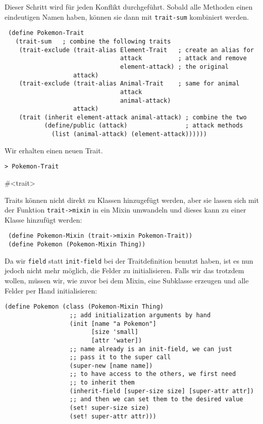 Dieser Schritt wird für jeden Konflikt durchgeführt. Sobald alle Methoden einen eindeutigen Namen haben, können sie dann mit \texttt{trait-sum} kombiniert werden.

\begin{lstlisting}
 (define Pokemon-Trait
   (trait-sum   ; combine the following traits
    (trait-exclude (trait-alias Element-Trait   ; create an alias for
                                attack          ; attack and remove
                                element-attack) ; the original
                   attack)
    (trait-exclude (trait-alias Animal-Trait    ; same for animal
                                attack         
                                animal-attack)
                   attack)
    (trait (inherit element-attack animal-attack) ; combine the two
           (define/public (attack)                ; attack methods
             (list (animal-attack) (element-attack))))))
\end{lstlisting}

Wir erhalten einen neuen Trait. 

\begin{lstlisting}
> Pokemon-Trait
\end{lstlisting}
{\routput \#<trait>}

Traits können nicht direkt zu Klassen hinzugefügt werden, aber sie lassen sich mit der Funktion \texttt{trait->mixin} in ein Mixin umwandeln und dieses kann zu einer Klasse hinzufügt werden:

\begin{lstlisting}
 (define Pokemon-Mixin (trait->mixin Pokemon-Trait))
 (define Pokemon (Pokemon-Mixin Thing))
\end{lstlisting}

Da wir \texttt{field} statt \texttt{init-field} bei der Traitdefinition benutzt haben, ist es nun jedoch nicht mehr möglich, die Felder zu initialisieren. Falls wir das trotzdem wollen, müssen wir, wie zuvor bei dem Mixin, eine Subklasse erzeugen und alle Felder per Hand initialisieren:

\begin{lstlisting}
(define Pokemon (class (Pokemon-Mixin Thing)
                  ;; add initialization arguments by hand
                  (init [name "a Pokemon"]
                        [size 'small]
                        [attr 'water])
                  ;; name already is an init-field, we can just
                  ;; pass it to the super call
                  (super-new [name name])
                  ;; to have access to the others, we first need
                  ;; to inherit them
                  (inherit-field [super-size size] [super-attr attr])
                  ;; and then we can set them to the desired value
                  (set! super-size size)
                  (set! super-attr attr)))
\end{lstlisting}

